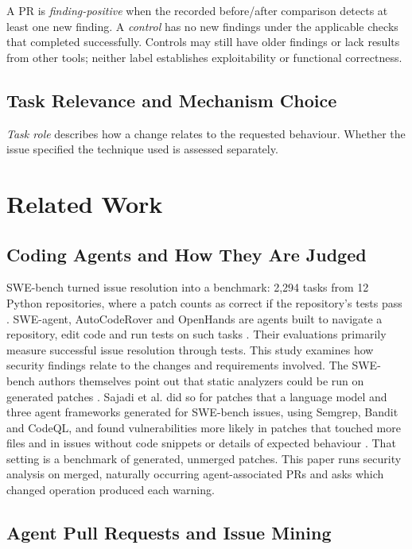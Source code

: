 \documentclass[acmsmall,screen,nonacm]{acmart}
\begin{document}
A PR is \emph{finding-positive} when the recorded before/after comparison detects at least one new finding. A \emph{control} has no new findings under the applicable checks that completed successfully. Controls may still have older findings or lack results from other tools; neither label establishes exploitability or functional correctness.

\subsection{Task Relevance and Mechanism Choice}

\emph{Task role} describes how a change relates to the requested behaviour. Whether the issue specified the technique used is assessed separately.

\section{Related Work}

\subsection{Coding Agents and How They Are Judged}

SWE-bench turned issue resolution into a benchmark: 2,294 tasks from 12 Python repositories, where a patch counts as correct if the repository's tests pass \cite{b9}. SWE-agent, AutoCodeRover and OpenHands are agents built to navigate a repository, edit code and run tests on such tasks \cite{b22,b25,b20}. Their evaluations primarily measure successful issue resolution through tests. This study examines how security findings relate to the changes and requirements involved. The SWE-bench authors themselves point out that static analyzers could be run on generated patches \cite{b9}. Sajadi et al. did so for patches that a language model and three agent frameworks generated for SWE-bench issues, using Semgrep, Bandit and CodeQL, and found vulnerabilities more likely in patches that touched more files and in issues without code snippets or details of expected behaviour \cite{b36}. That setting is a benchmark of generated, unmerged patches. This paper runs security analysis on merged, naturally occurring agent-associated PRs and asks which changed operation produced each warning.

\subsection{Agent Pull Requests and Issue Mining}
\end{document}
